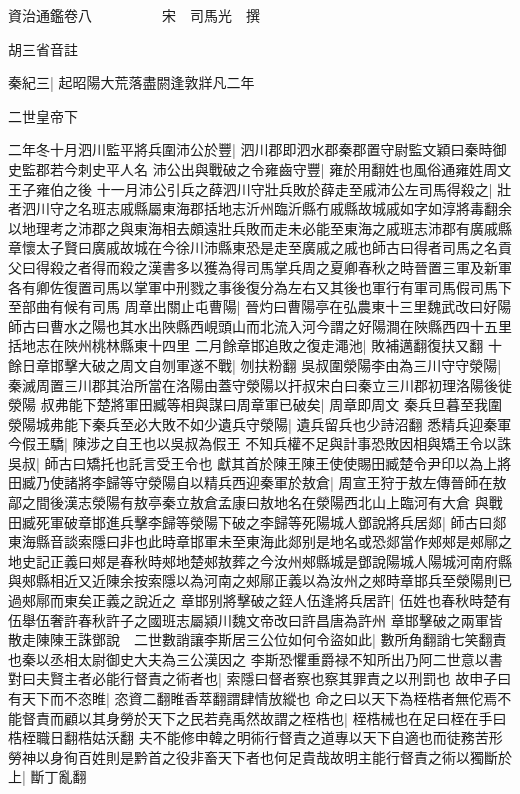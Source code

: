 資治通鑑卷八　　　　　宋　司馬光　撰

胡三省音註

秦紀三|{
	起昭陽大荒落盡閼逢敦牂凡二年}


二世皇帝下

二年冬十月泗川監平將兵圍沛公於豐|{
	泗川郡即泗水郡秦郡置守尉監文穎曰秦時御史監郡若今刺史平人名}
沛公出與戰破之令雍齒守豐|{
	雍於用翻姓也風俗通雍姓周文王子雍伯之後}
十一月沛公引兵之薛泗川守壯兵敗於薛走至戚沛公左司馬得殺之|{
	壯者泗川守之名班志戚縣屬東海郡括地志沂州臨沂縣冇戚縣故城戚如字如淳將毒翻余以地理考之沛郡之與東海相去頗遠壯兵敗而走未必能至東海之戚班志沛郡有廣戚縣章懷太子賢曰廣戚故城在今徐川沛縣東恐是走至廣戚之戚也師古曰得者司馬之名貢父曰得殺之者得而殺之漢書多以獲為得司馬掌兵周之夏卿春秋之時晉置三軍及新軍各有卿佐復置司馬以掌軍中刑戮之事後復分為左右又其後也軍行有軍司馬假司馬下至部曲有候有司馬}
周章出關止屯曹陽|{
	晉灼曰曹陽亭在弘農東十三里魏武改曰好陽師古曰曹水之陽也其水出陜縣西峴頭山而北流入河今謂之好陽澗在陜縣西四十五里括地志在陜州桃林縣東十四里}
二月餘章邯追敗之復走澠池|{
	敗補邁翻復扶又翻}
十餘日章邯擊大破之周文自刎軍遂不戰|{
	刎扶粉翻}
吳叔圍滎陽李由為三川守守滎陽|{
	秦滅周置三川郡其治所當在洛陽由蓋守滎陽以扞叔宋白曰秦立三川郡初理洛陽後徙滎陽}
叔弗能下楚將軍田臧等相與謀曰周章軍已破矣|{
	周章即周文}
秦兵旦暮至我圍滎陽城弗能下秦兵至必大敗不如少遺兵守滎陽|{
	遺兵留兵也少詩沼翻}
悉精兵迎秦軍今假王驕|{
	陳涉之自王也以吳叔為假王}
不知兵權不足與計事恐敗因相與矯王令以誅吳叔|{
	師古曰矯托也託言受王令也}
獻其首於陳王陳王使使賜田臧楚令尹印以為上將田臧乃使諸將李歸等守滎陽自以精兵西迎秦軍於敖倉|{
	周宣王狩于敖左傳晉師在敖鄗之間後漢志滎陽有敖亭秦立敖倉孟康曰敖地名在滎陽西北山上臨河有大倉}
與戰田臧死軍破章邯進兵擊李歸等滎陽下破之李歸等死陽城人鄧說將兵居郯|{
	師古曰郯東海縣音談索隱曰非也此時章邯軍未至東海此郯别是地名或恐郯當作郟郟是郟鄏之地史記正義曰郟是春秋時郟地楚郟敖葬之今汝州郟縣城是鄧說陽城人陽城河南府縣與郟縣相近又近陳余按索隱以為河南之郟鄏正義以為汝州之郟時章邯兵至滎陽則已過郟鄏而東矣正義之說近之}
章邯别將擊破之銍人伍逢將兵居許|{
	伍姓也春秋時楚有伍舉伍奢許春秋許子之國班志屬潁川魏文帝改曰許昌唐為許州}
章邯擊破之兩軍皆散走陳陳王誅鄧說　二世數誚讓李斯居三公位如何令盜如此|{
	數所角翻誚七笑翻責也秦以丞相太尉御史大夫為三公漢因之}
李斯恐懼重爵禄不知所出乃阿二世意以書對曰夫賢主者必能行督責之術者也|{
	索隱曰督者察也察其罪責之以刑罰也}
故申子曰有天下而不恣睢|{
	恣資二翻睢香萃翻謂肆情放縱也}
命之曰以天下為桎梏者無佗焉不能督責而顧以其身勞於天下之民若堯禹然故謂之桎梏也|{
	桎梏械也在足曰桎在手曰梏桎職日翻梏姑沃翻}
夫不能修申韓之明術行督責之道專以天下自適也而徒務苦形勞神以身徇百姓則是黔首之役非畜天下者也何足貴哉故明主能行督責之術以獨斷於上|{
	斷丁亂翻}
